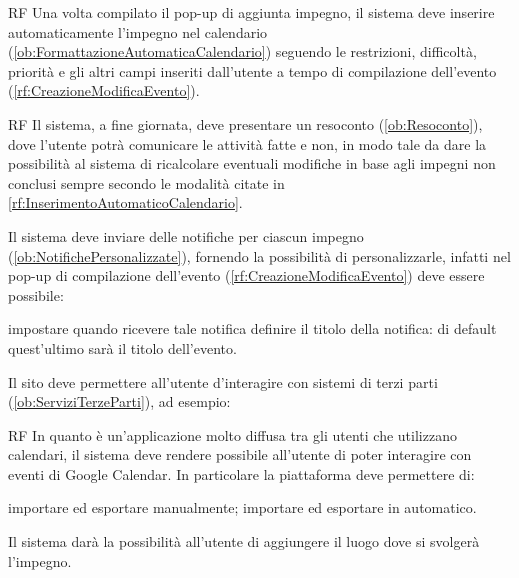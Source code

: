 \begin{listaPersonale}{RF}
	 Una volta compilato il pop-up di aggiunta impegno, il sistema deve inserire automaticamente l'impegno nel calendario (\ref{ob:FormattazioneAutomaticaCalendario}) seguendo le restrizioni, difficoltà, priorità e gli altri campi inseriti dall'utente a tempo di compilazione dell'evento (\ref{rf:CreazioneModificaEvento}).
	\begin{listaPersonale2}{RF}
		 Il sistema, a fine giornata, deve presentare un resoconto (\ref{ob:Resoconto}), dove l'utente potrà comunicare le attività fatte e non, in modo tale da dare la possibilità al sistema di ricalcolare eventuali modifiche in base agli impegni non conclusi sempre secondo le modalità citate in \ref{rf:InserimentoAutomaticoCalendario}.
	\end{listaPersonale2}

	 Il sistema deve inviare delle notifiche per ciascun impegno (\ref{ob:NotifichePersonalizzate}), fornendo la possibilità di personalizzarle, infatti nel pop-up di compilazione dell'evento (\ref{rf:CreazioneModificaEvento}) deve essere possibile:
	\begin{listaPersonale2}{}
		 impostare quando ricevere tale notifica
		 definire il titolo della notifica: di default quest'ultimo sarà il titolo dell'evento.
	\end{listaPersonale2}

	 Il sito deve permettere all'utente d'interagire con sistemi di terzi parti (\ref{ob:ServiziTerzeParti}), ad esempio:

	\begin{listaPersonale2}{RF}
		 In quanto è un'applicazione molto diffusa tra gli utenti che utilizzano calendari, il sistema deve rendere possibile all'utente di poter interagire con eventi di Google Calendar. In particolare la piattaforma deve permettere di:
		\begin{listaPersonale3}{}
			 importare ed esportare manualmente;
			 importare ed esportare in automatico.
		\end{listaPersonale3}

		 Il sistema darà la possibilità all'utente di aggiungere il luogo dove si svolgerà l'impegno.
	\end{listaPersonale2}


\end{listaPersonale}
